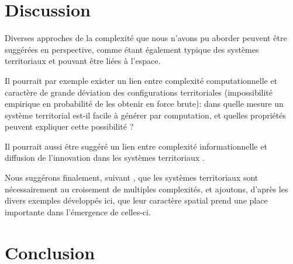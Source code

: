 \documentclass[11pt]{article}
\begin{document}

%


\section{Discussion}



Diverses approches de la complexité que nous n'avons pu aborder peuvent être suggérées en perspective, comme étant également typique des systèmes territoriaux et pouvant être liées à l'espace.

Il pourrait par exemple exister un lien entre complexité computationnelle et caractère de grande déviation des configurations territoriales (impossibilité empirique en probabilité de les obtenir en force brute): dans quelle mesure un système territorial est-il facile à générer par computation, et quelles propriétés peuvent expliquer cette possibilité ?

Il pourrait aussi être suggéré un lien entre complexité informationnelle et diffusion de l'innovation dans les systèmes territoriaux \citep{favaro2011gibrat}.



Nous suggérons finalement, suivant \cite{raimbault2017complexity}, que les systèmes territoriaux sont nécessairement au croisement de multiples complexités, et ajoutons, d'après les divers exemples développés ici, que leur caractère spatial prend une place importante dans l'émergence de celles-ci.


\section{Conclusion}











\end{document}
